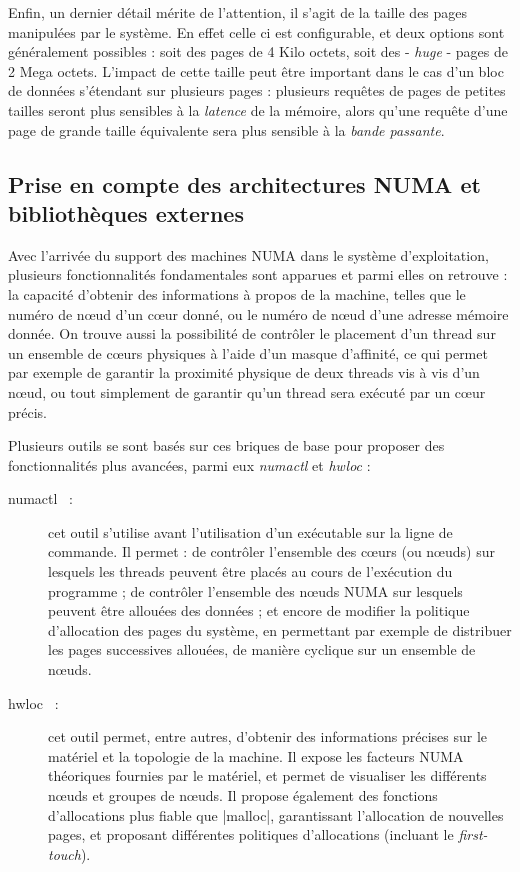 Enfin, un dernier détail mérite de l'attention, il s'agit de la taille des pages manipulées par le système.
En effet celle ci est configurable, et deux options sont généralement possibles : soit des pages de 4 Kilo octets, soit des - \emph{huge} - pages de 2 Mega octets.
L'impact de cette taille peut être important dans le cas d'un bloc de données s'étendant sur plusieurs pages : plusieurs requêtes de pages de petites tailles seront plus sensibles à la \emph{latence} de la mémoire, alors qu'une requête d'une page de grande taille équivalente sera plus sensible à la \emph{bande passante}.

\subsection{Prise en compte des architectures NUMA et bibliothèques externes}\label{sec:context:os:lib}

Avec l'arrivée du support des machines NUMA dans le système d'exploitation, plusieurs fonctionnalités fondamentales sont apparues et parmi elles on retrouve : la capacité d'obtenir des informations à propos de la machine, telles que le numéro de nœud d'un cœur donné, ou le numéro de nœud d'une adresse mémoire donnée.
On trouve aussi la possibilité de contrôler le placement d'un thread sur un ensemble de cœurs physiques à l'aide d'un masque d'affinité, ce qui permet par exemple de garantir la proximité physique de deux threads vis à vis d'un nœud, ou tout simplement de garantir qu'un thread sera exécuté par un cœur précis.

Plusieurs outils se sont basés sur ces briques de base pour proposer des fonctionnalités plus avancées, parmi eux \emph{numactl} et \emph{hwloc} :

\begin{description}
  \item [numactl~\cite{numactl} :] cet outil s'utilise avant l'utilisation d'un exécutable sur la ligne de commande. Il permet : de contrôler l'ensemble des cœurs (ou nœuds) sur lesquels les threads peuvent être placés au cours de l'exécution du programme ;
    de contrôler l'ensemble des nœuds NUMA sur lesquels peuvent être allouées des données ;
    et encore de modifier la politique d'allocation des pages du système, en permettant par exemple de distribuer les pages successives allouées, de manière cyclique sur un ensemble de nœuds.
  \item [hwloc~\cite{Broquedis2010} :] cet outil permet, entre autres, d'obtenir des informations précises sur le matériel et la topologie de la machine. Il expose les facteurs NUMA théoriques fournies par le matériel, et permet de visualiser les différents nœuds et groupes de nœuds.
  Il propose également des fonctions d'allocations plus fiable que |malloc|, garantissant l'allocation de nouvelles pages, et proposant différentes politiques d'allocations (incluant le \emph{first-touch}).
\end{description}


